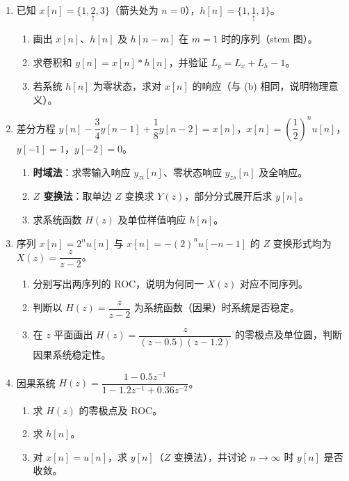 \documentclass[11pt,a4paper]{ctexart}
\begin{document}
\begin{enumerate}[label=\textbf{题\arabic*.},leftmargin=*,itemsep=1.2em,start=16]

\item \label{q:16}
已知 $x[n]=\{1,\underset{\uparrow}{2},3\}$（箭头处为 $n=0$），$h[n]=\{1,\underset{\uparrow}{1},1\}$。
\begin{enumerate}[label=(\alph*)]
    \item 画出 $x[n]$、$h[n]$ 及 $h[n-m]$ 在 $m=1$ 时的序列（stem 图）。
    \item 求卷积和 $y[n]=x[n]*h[n]$，并验证 $L_y=L_x+L_h-1$。
    \item 若系统 $h[n]$ 为零状态，求对 $x[n]$ 的响应（与 (b) 相同，说明物理意义）。
\end{enumerate}

\item \label{q:17}
差分方程 $y[n]-\dfrac{3}{4}y[n-1]+\dfrac{1}{8}y[n-2]=x[n]$，$x[n]=\left(\dfrac{1}{2}\right)^n u[n]$，$y[-1]=1$，$y[-2]=0$。
\begin{enumerate}[label=(\alph*)]
    \item \textbf{时域法}：求零输入响应 $y_{zi}[n]$、零状态响应 $y_{zs}[n]$ 及全响应。
    \item \textbf{$Z$ 变换法}：取单边 $Z$ 变换求 $Y(z)$，部分分式展开后求 $y[n]$。
    \item 求系统函数 $H(z)$ 及单位样值响应 $h[n]$。
\end{enumerate}

\item \label{q:18}
序列 $x[n]=2^n u[n]$ 与 $x[n]=-(2)^n u[-n-1]$ 的 $Z$ 变换形式均为 $X(z)=\dfrac{z}{z-2}$。
\begin{enumerate}[label=(\alph*)]
    \item 分别写出两序列的 ROC，说明为何同一 $X(z)$ 对应不同序列。
    \item 判断以 $H(z)=\dfrac{z}{z-2}$ 为系统函数（因果）时系统是否稳定。
    \item 在 $z$ 平面画出 $H(z)=\dfrac{z}{(z-0.5)(z-1.2)}$ 的零极点及单位圆，判断因果系统稳定性。
\end{enumerate}

\item \label{q:19}
因果系统 $H(z)=\dfrac{1-0.5z^{-1}}{1-1.2z^{-1}+0.36z^{-2}}$。
\begin{enumerate}[label=(\alph*)]
    \item 求 $H(z)$ 的零极点及 ROC。
    \item 求 $h[n]$。
    \item 对 $x[n]=u[n]$，求 $y[n]$（$Z$ 变换法），并讨论 $n\to\infty$ 时 $y[n]$ 是否收敛。
\end{enumerate}


\end{enumerate}
\end{document}
